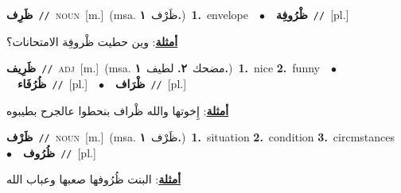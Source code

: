 \documentclass[10pt,a4paper,twoside]{article} %
\begin{document}
\begin{multicols}{2}
{\setlength\topsep{0pt}\textbf{\foreignlanguage{arabic}{ظَرِف}}\ {\color{gray}\texttt{//}\color{black}}\ \textsc{noun}\ [m.]\ \color{gray}(msa. \foreignlanguage{arabic}{ظَرْف}~\foreignlanguage{arabic}{\textbf{١.}})\color{black}\ \textbf{1.}~envelope\ \ $\bullet$\ \ \setlength\topsep{0pt}\textbf{\foreignlanguage{arabic}{ظْرُوفِة}}\ {\color{gray}\texttt{//}\color{black}}\ [pl.]\  \begin{flushright}\color{gray}\foreignlanguage{arabic}{\textbf{\underline{\foreignlanguage{arabic}{أمثلة}}}: وين حطيت ظْروفِة الامتحانات؟}\end{flushright}\color{black}} \vspace{2mm}

{\setlength\topsep{0pt}\textbf{\foreignlanguage{arabic}{ظَرِيف}}\ {\color{gray}\texttt{//}\color{black}}\ \textsc{adj}\ [m.]\ \color{gray}(msa. \foreignlanguage{arabic}{مضحك}~\foreignlanguage{arabic}{\textbf{٢.}}  \foreignlanguage{arabic}{لطيف}~\foreignlanguage{arabic}{\textbf{١.}})\color{black}\ \textbf{1.}~nice  \textbf{2.}~funny\ \ $\bullet$\ \ \setlength\topsep{0pt}\textbf{\foreignlanguage{arabic}{ظُرُفَاء}}\ {\color{gray}\texttt{//}\color{black}}\ [pl.]\ \ $\bullet$\ \ \setlength\topsep{0pt}\textbf{\foreignlanguage{arabic}{ظْرَاف}}\ {\color{gray}\texttt{//}\color{black}}\ [pl.]\  \begin{flushright}\color{gray}\foreignlanguage{arabic}{\textbf{\underline{\foreignlanguage{arabic}{أمثلة}}}: إِخوتها والله ظْراف بنحطوا عالجرح بطيبوه}\end{flushright}\color{black}} \vspace{2mm}

{\setlength\topsep{0pt}\textbf{\foreignlanguage{arabic}{ظَرْف}}\ {\color{gray}\texttt{//}\color{black}}\ \textsc{noun}\ [m.]\ \color{gray}(msa. \foreignlanguage{arabic}{ظَرْف}~\foreignlanguage{arabic}{\textbf{١.}})\color{black}\ \textbf{1.}~situation  \textbf{2.}~condition  \textbf{3.}~circmstances\ \ $\bullet$\ \ \setlength\topsep{0pt}\textbf{\foreignlanguage{arabic}{ظُرُوف}}\ {\color{gray}\texttt{//}\color{black}}\ [pl.]\  \begin{flushright}\color{gray}\foreignlanguage{arabic}{\textbf{\underline{\foreignlanguage{arabic}{أمثلة}}}: البنت ظُرُوفها صعبها وعباب الله}\end{flushright}\color{black}} \vspace{2mm}


\end{multicols}
\end{document}
